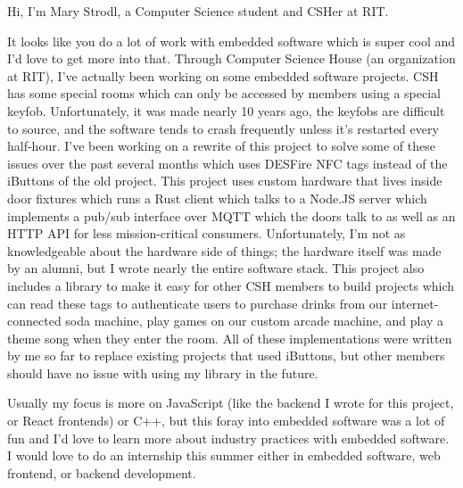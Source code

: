 \documentclass[10pt,letter]{article}
\begin{document}
\noindent
Hi, I'm Mary Strodl, a Computer Science student and CSHer at RIT.

\bigskip

\noindent
It looks like you do a lot of work with embedded software which is super cool and I'd love to get more into that. Through Computer Science House (an organization at RIT), I've actually been working on some embedded software projects. CSH has some special rooms which can only be accessed by members using a special keyfob. Unfortunately, it was made nearly 10 years ago, the keyfobs are difficult to source, and the software tends to crash frequently unless it's restarted every half-hour. I've been working on a rewrite of this project to solve some of these issues over the past several months which uses DESFire NFC tags instead of the iButtons of the old project. This project uses custom hardware that lives inside door fixtures which runs a Rust client which talks to a Node.JS server which implements a pub/sub interface over MQTT which the doors talk to as well as an HTTP API for less mission-critical consumers. Unfortunately, I'm not as knowledgeable about the hardware side of things; the hardware itself was made by an alumni, but I wrote nearly the entire software stack. This project also includes a library to make it easy for other CSH members to build projects which can read these tags to authenticate users to purchase drinks from our internet-connected soda machine, play games on our custom arcade machine, and play a theme song when they enter the room. All of these implementations were written by me so far to replace existing projects that used iButtons, but other members should have no issue with using my library in the future.

\bigskip

\noindent
Usually my focus is more on JavaScript (like the backend I wrote for this project, or React frontends) or C++, but this foray into embedded software was a lot of fun and I'd love to learn more about industry practices with embedded software. I would love to do an internship this summer either in embedded software, web frontend, or backend development.
\end{document}
